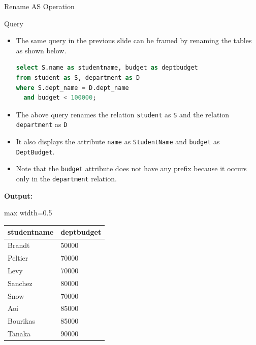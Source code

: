 \documentclass[aspectratio=169, xcolor=dvipsnames]{beamer}
\begin{document}
\begin{frame}[fragile]{Rename AS Operation}
    \begin{block}{Query}
        \begin{itemize}[<+->]
            \item The same query in the previous slide can be framed by renaming the tables as shown below.
            \begin{lstlisting}[language=SQL]
select S.name as studentname, budget as deptbudget 
from student as S, department as D 
where S.dept_name = D.dept_name 
  and budget < 100000;
            \end{lstlisting}
            \item The above query renames the relation \texttt{student} as \texttt{S} and the relation \texttt{department} as \texttt{D}
            \item It also displays the attribute \texttt{name} as \texttt{StudentName} and \texttt{budget} as \texttt{DeptBudget}.
            \item Note that the \texttt{budget} attribute does not have any prefix because it occurs only in the \texttt{department} relation.
        \end{itemize}
    \end{block}

    \textbf{Output:}
    \vspace{-0.5em}
    \begin{center}
        \begin{adjustbox}{max width=0.5\textwidth}
        \begin{tabular}{|l|l|}
        \hline
        \textbf{studentname} & \textbf{deptbudget} \\ \hline
        Brandt & 50000 \\ \hline
        Peltier & 70000 \\ \hline
        Levy & 70000 \\ \hline
        Sanchez & 80000 \\ \hline
        Snow & 70000 \\ \hline
        Aoi & 85000 \\ \hline
        Bourikas & 85000 \\ \hline
        Tanaka & 90000 \\ \hline
        \end{tabular}
        \end{adjustbox}
    \end{center}
\end{frame}
\end{document}

